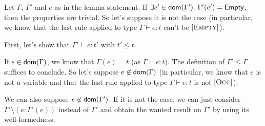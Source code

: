 \documentclass[a4paper]{article}
\theoremstyle{definition}
\begin{document}
        Let $\Gamma$, $\Gamma'$ and $e$ as in the lemma statement.
        If $\exists e' \in \textsf{dom}(\Gamma').\ \Gamma'(e') = \textsf{Empty}$, then the properties are trivial.
        So let's suppose it is not the case (in particular, we know that the last rule applied to type $\Gamma \vdash e:t$ can't be $[\textsc{Empty}]$).
    
        First, let's show that $\Gamma' \vdash e:t' \text{ with } t' \leq t$.
    
        If $e\in\textsf{dom}(\Gamma)$, we know that $\Gamma(e)=t$ (as $\Gamma \vdash e:t$). The definition of $\Gamma' \leq \Gamma$ suffices to conclude.
        So let's suppose $e\not\in\textsf{dom}(\Gamma)$ (in particular, we know that $e$ is not a variable and that the last rule applied to type $\Gamma \vdash e:t$ is not $[\textsc{Occ}]$).
    
        We can also suppose $e\not\in\textsf{dom}(\Gamma')$. If it is not the case, we can just consider $\Gamma'\setminus(e:\Gamma'(e))$ instead of $\Gamma'$
        and obtain the wanted result on $\Gamma'$ by using its well-formedness.
\end{document}
